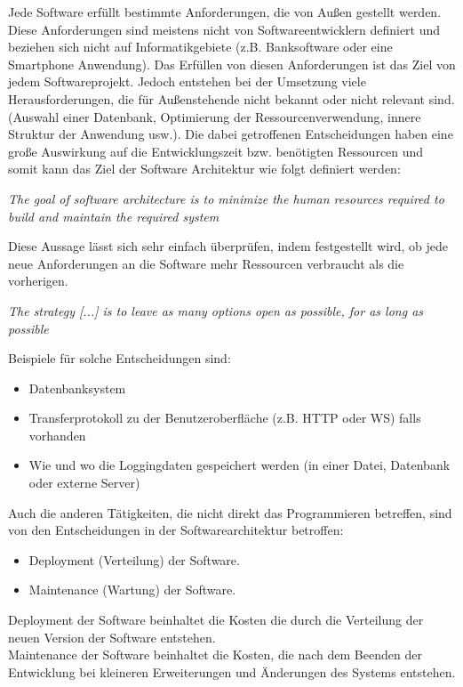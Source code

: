 Jede Software erfüllt bestimmte Anforderungen, die von Außen gestellt werden. 
Diese Anforderungen sind meistens nicht von Softwareentwicklern definiert und beziehen sich nicht auf Informatikgebiete 
    (z.B. Banksoftware oder eine Smartphone Anwendung). 
    Das Erfüllen von diesen Anforderungen ist das Ziel von jedem Softwareprojekt.
    Jedoch entstehen bei der Umsetzung viele Herausforderungen, die für Außenstehende nicht bekannt oder nicht relevant sind.
    (Auswahl einer Datenbank, Optimierung der Ressourcenverwendung, innere Struktur der Anwendung usw.). 
    Die dabei getroffenen Entscheidungen haben eine große Auswirkung auf die Entwicklungszeit bzw.
    benötigten Ressourcen und somit kann das Ziel der Software Architektur wie folgt definiert werden:

    \textit{The goal of software architecture is to minimize the human resources required
    to build and maintain the required system}\cite[5]{cleanArchitecture}

    Diese Aussage lässt sich sehr einfach überprüfen, indem festgestellt wird, 
    ob jede neue Anforderungen an die Software mehr Ressourcen verbraucht als die vorherigen.

    \textit{The strategy [...] is to leave as many options open as possible, for as long as possible}
    \cite[136]{cleanArchitecture}

    Beispiele für solche Entscheidungen sind:
    \begin{itemize}
        \item Datenbanksystem
        \item Transferprotokoll zu der Benutzeroberfläche (z.B. HTTP oder WS) falls vorhanden
        \item Wie und wo die Loggingdaten gespeichert werden (in einer Datei, Datenbank oder externe Server)
    \end{itemize}

    Auch die anderen Tätigkeiten, die nicht direkt das Programmieren betreffen, 
    sind von den Entscheidungen in der Softwarearchitektur betroffen:
    \begin{itemize}
        \item Deployment (Verteilung) der Software.
        \item Maintenance (Wartung) der Software.
    \end{itemize}

    Deployment der Software beinhaltet die Kosten die durch die Verteilung der neuen Version der Software entstehen.\\
    Maintenance der Software beinhaltet die Kosten, die nach dem Beenden der Entwicklung bei kleineren Erweiterungen und Änderungen des Systems entstehen.

